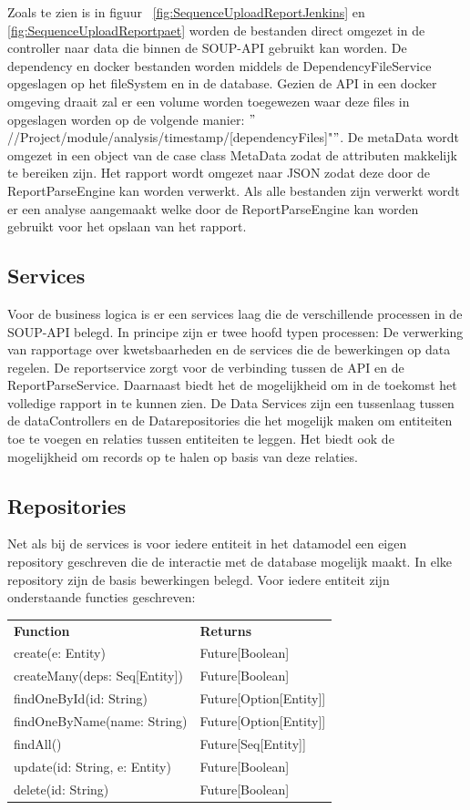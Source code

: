 Zoals te zien is in figuur ~\ref{fig:SequenceUploadReportJenkins} en \ref{fig:SequenceUploadReportpaet} worden de bestanden direct omgezet in de controller naar data die binnen de SOUP-API gebruikt kan worden. De dependency en docker bestanden worden middels de DependencyFileService opgeslagen op het fileSystem en in de database. Gezien de API in een docker omgeving draait zal er een volume worden toegewezen waar deze files in opgeslagen worden op de volgende manier: $"$//Project/module/analysis/timestamp/[dependencyFiles]"$"$. De metaData wordt omgezet in een object van de case class MetaData zodat de attributen makkelijk te bereiken zijn. Het rapport wordt omgezet naar JSON zodat deze door de ReportParseEngine kan worden verwerkt. Als alle bestanden zijn verwerkt wordt er een analyse aangemaakt welke door de ReportParseEngine kan worden gebruikt voor het opslaan van het rapport.

\subsection{Services}\label{subsec:Services}
Voor de business logica is er een services laag die de verschillende processen in de SOUP-API belegd. In principe zijn er twee hoofd typen processen: De verwerking van rapportage over kwetsbaarheden en de services die de bewerkingen op data regelen.
De reportservice zorgt voor de verbinding tussen de API en de ReportParseService. Daarnaast biedt het de mogelijkheid om in de toekomst het volledige rapport in te kunnen zien.
De Data Services zijn een tussenlaag tussen de dataControllers en de Datarepositories die het mogelijk maken om entiteiten toe te voegen en relaties tussen entiteiten te leggen. Het biedt ook de mogelijkheid om records op te halen op basis van deze relaties.

\subsection{Repositories}\label{subsec:repositories}
Net als bij de services is voor iedere entiteit in het datamodel een eigen repository geschreven die de interactie met de database mogelijk maakt. In elke repository zijn de basis bewerkingen belegd. Voor iedere entiteit zijn onderstaande functies geschreven:

\begin{tabular}{ll}
    \textbf{Function} & \textbf{Returns}\\
    create(e: Entity) & Future[Boolean] \\
    createMany(deps: Seq[Entity])& Future[Boolean]\\
    findOneById(id: String) & Future[Option[Entity]]\\
    findOneByName(name: String) & Future[Option[Entity]]\\
    findAll() & Future[Seq[Entity]] \\
    update(id: String, e: Entity) & Future[Boolean]\\
    delete(id: String) & Future[Boolean] \\
\end{tabular} \\

